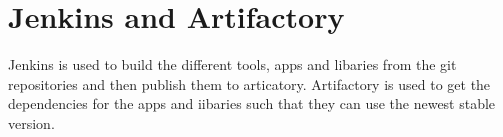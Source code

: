 \section{Jenkins and Artifactory}
Jenkins is used to build the different tools, apps and libaries from the git
repositories and then publish them to articatory. Artifactory is used to get the
dependencies for the apps and iibaries such that they can use the newest stable
version.
